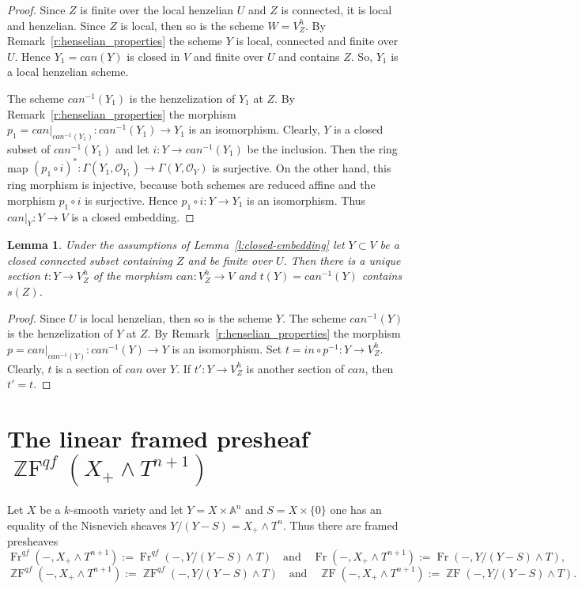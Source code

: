 \documentclass[a4paper,11pt,reqno]{amsart}
\newtheorem{lemma}[theorem]{Lemma}
\begin{document}
\begin{proof}
Since $Z$ is finite over the local henzelian $U$ and $Z$ is
connected, it is local and henzelian. Since $Z$ is local, then so is
the scheme $W=V^h_Z$. By Remark~\ref{r:henselian_properties} the
scheme $Y$ is local, connected and finite over $U$. Hence
$Y_1=can(Y)$ is closed in $V$ and finite over $U$ and contains $Z$.
So, $Y_1$ is a local henzelian scheme.

The scheme $can^{-1}(Y_1)$ is the henzelization of $Y_1$ at $Z$. By
Remark~\ref{r:henselian_properties} the morphism
$p_1=can|_{can^{-1}(Y_1)}:can^{-1}(Y_1)\to Y_1$ is an isomorphism.
Clearly, $Y$ is a closed subset of $can^{-1}(Y_1)$ and let $i:Y \to
can^{-1}(Y_1)$ be the inclusion. Then the ring map $(p_1\circ i)^*:
\Gamma(Y_1,\mathcal O_{Y_1})\to \Gamma(Y,\mathcal O_{Y})$ is
surjective. On the other hand, this ring morphism is injective,
because both schemes are reduced affine and the morphism $p_1\circ
i$ is surjective. Hence $p_1\circ i:Y\to Y_1$ is an isomorphism.
Thus $can|_Y:Y\to V$ is a closed embedding.
\end{proof}

\begin{lemma}\label{l:lift}
Under the assumptions of Lemma~\ref{l:closed-embedding} let
$Y\subset V$ be a closed connected subset containing $Z$ and be
finite over $U$. Then there is a unique section $t:Y\to V^h_Z$ of
the morphism $can:V^h_Z\to V$ and $t(Y)=can^{-1}(Y)$ contains
$s(Z)$.
\end{lemma}

\begin{proof}
Since $U$ is local henzelian, then so is the scheme $Y$. The scheme
$can^{-1}(Y)$ is the henzelization of $Y$ at $Z$. By
Remark~\ref{r:henselian_properties} the morphism
$p=can|_{can^{-1}(Y)}:can^{-1}(Y)\to Y$ is an isomorphism. Set
$t=in\circ p^{-1}:Y\to V^h_Z$. Clearly, $t$ is a section of $can$
over $Y$. If $t':Y\to V^h_Z$ is another section of $can$, then
$t'=t$.
\end{proof}

\section{The linear framed presheaf ${\operatorname{\mathbb{Z}F}}^{qf}(X_+\wedge T^{n+1})$}\label{s:Fr(X_T_n}

Let $X$ be a $k$-smooth variety and let $Y=X\times {\mathbb{A}}^n$ and
$S=X\times \{0\}$ one has an equality of the Nisnevich sheaves
$Y/(Y-S)=X_+\wedge T^n$. Thus there are framed presheaves
   $${\operatorname{Fr}}^{qf}(-,X_+\wedge T^{n+1}):={\operatorname{Fr}}^{qf}(-,Y/(Y-S)\wedge T) \quad \text{and} \quad {\operatorname{Fr}}(-,X_+\wedge T^{n+1}):={\operatorname{Fr}}(-,Y/(Y-S)\wedge T),$$
$${\operatorname{\mathbb{Z}F}}^{qf}(-,X_+\wedge T^{n+1}):={\operatorname{\mathbb{Z}F}}^{qf}(-,Y/(Y-S)\wedge T) \quad \text{and} \quad {\operatorname{\mathbb{Z}F}}(-,X_+\wedge T^{n+1}):={\operatorname{\mathbb{Z}F}}(-,Y/(Y-S)\wedge T).$$
\end{document}
